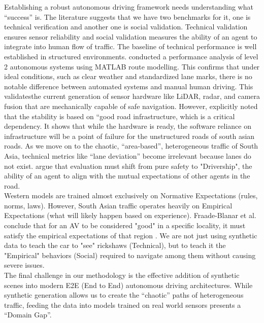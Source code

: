 Establishing a robust autonomous driving framework needs understanding what “success” is. The literature suggests that we have two benchmarks for it, one is technical verification and another one is social validation. Technical validation ensures sensor reliability and social validation measures the ability of an agent to integrate into human flow of traffic. The baseline of technical performance is well established in structured environments. \cite{Pucher2018Performance} conducted a performance analysis of level 2 autonomous systems using MATLAB route modelling. This confirms that under ideal conditions, such as clear weather and standardized lane marks, there is no notable difference between automated systems and manual human driving. This validatesthe  current generation of sensor hardware like LiDAR, radar, and camera fusion that are mechanically capable of safe navigation. However, \cite{Pucher2018Performance} explicitly noted that the stability is based on “good road infrastructure, which is a critical dependency. It shows that while the hardware is ready, the software reliance on infrastructure will be a point of failure for the unstructured roads of south asian roads. As we move on to the chaotic, “area-based”, heterogeneous traffic of South Asia, technical metrics like “lane deviation” become irrelevant because lanes do not exist. \cite{FraadeBlanar2025Drivership} argue that evaluation must shift from pure safety to "Drivership", the ability of an agent to align with the mutual expectations of other agents in the road. \\

Western models are trained almost exclusively on Normative Expectations (rules, norms, laws). However, South Asian traffic operates heavily on Empirical Expectations (what will likely happen based on experience). Fraade-Blanar et al. conclude that for an AV to be considered "good" in a specific locality, it must satisfy the empirical expectations of that region \cite{FraadeBlanar2025Drivership}. We are not just using synthetic data to teach the car to "see" rickshaws (Technical), but to teach it the "Empirical" behaviors (Social) required to navigate among them without causing severe issues.\\


The final challenge in our methodology is the effective addition of synthetic scenes into modern E2E (End to End) autonomous driving architectures. While synthetic generation allows us to create the “chaotic” paths of heterogeneous traffic, feeding the data into models trained on real world sensors presents a “Domain Gap”.\\

